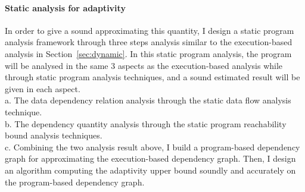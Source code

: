 
\paragraph{{Static analysis for adaptivity}}
In order to give a sound approximating this quantity, I design a static program analysis framework through three steps analysis
similar to the execution-based analysis in Section~\ref{sec:dynamic}.
In this static program analysis, the program will be analysed in the same 3 aspects as the execution-based analysis 
   while through static program analysis techniques, and a sound estimated result will be given in each aspect.
   \\
	a. The data dependency relation analysis through the static data flow analysis technique.
   \\
	b. The dependency quantity analysis through the static program reachability bound analysis techniques.
   \\
	c. Combining the two analysis result above, I build a program-based dependency graph for approximating
    the execution-based dependency graph. Then, I design an algorithm computing the adaptivity upper bound soundly 
   and accurately on the program-based dependency graph.
%
